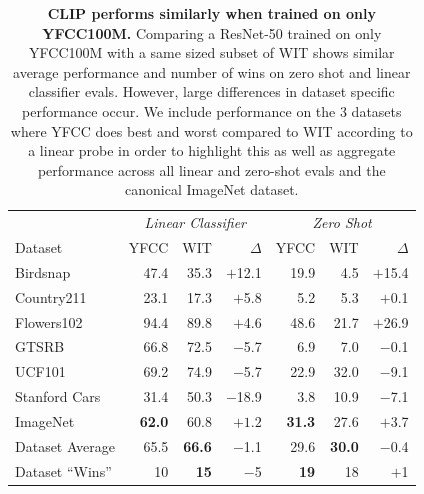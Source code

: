 \documentclass{article}
\begin{document}
\begin{table}[t]
\vskip 0.15in
\scriptsize
\begin{center}
\begin{tabular}{l|rrr|rrr}
\toprule
& \multicolumn{3}{c}{\textit{Linear Classifier}} & \multicolumn{3}{c}{\textit{Zero Shot}} \\
Dataset & YFCC & WIT & $\Delta$ & YFCC & WIT & $\Delta$ \\
\midrule
Birdsnap      & 47.4 & 35.3 & $+$12.1 & 19.9 &  4.5 & $+$15.4 \\
Country211    & 23.1 & 17.3 &  $+$5.8 &  5.2 &  5.3 &  $+$0.1 \\
Flowers102    & 94.4 & 89.8 &  $+$4.6 & 48.6 & 21.7 & $+$26.9 \\
GTSRB         & 66.8 & 72.5 &  $-$5.7 &  6.9 &  7.0 &  $-$0.1 \\
UCF101        & 69.2 & 74.9 &  $-$5.7 & 22.9 & 32.0 &  $-$9.1 \\
Stanford Cars & 31.4 & 50.3 & $-$18.9 &  3.8 & 10.9 &  $-$7.1 \\
\midrule
ImageNet & \textbf{62.0} & 60.8 & $+1.2$ & \textbf{31.3} & 27.6 & $+$3.7 \\
Dataset Average  & 65.5 & \textbf{66.6} & $-$1.1 & 29.6 & \textbf{30.0} & $-$0.4 \\
Dataset ``Wins'' & 10 & \textbf{15} & $-$5 & \textbf{19} & 18 & $+$1 \\
\bottomrule
\end{tabular}
\caption{\textbf{CLIP performs similarly when trained on only YFCC100M.} Comparing a ResNet-50 trained on only YFCC100M with a same sized subset of WIT shows similar average performance and number of wins on zero shot and linear classifier evals. However, large differences in dataset specific performance occur. We include performance on the 3 datasets where YFCC does best and worst compared to WIT according to a linear probe in order to highlight this as well as aggregate performance across all linear and zero-shot evals and the canonical ImageNet dataset.}
\label{dataset_ablation_table}
\end{center}
\vskip -0.1in
\end{table}
\end{document}
